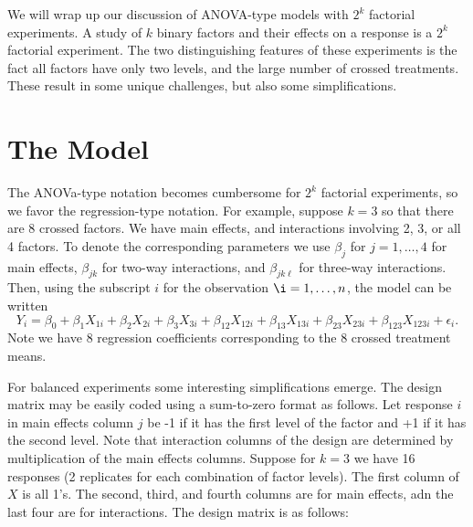 \documentclass[
]{book}
\begin{document}
We will wrap up our discussion of ANOVA-type models with \(2^k\) factorial experiments. A study of \(k\) binary factors and their effects on a response is a \(2^k\) factorial experiment. The two distinguishing features of these experiments is the fact all factors have only two levels, and the large number of crossed treatments. These result in some unique challenges, but also some simplifications.

\hypertarget{the-model-1}{%
\section{The Model}\label{the-model-1}}

The ANOVa-type notation becomes cumbersome for \(2^k\) factorial experiments, so we favor the regression-type notation. For example, suppose \(k=3\) so that there are 8 crossed factors. We have main effects, and interactions involving 2, 3, or all 4 factors. To denote the corresponding parameters we use \(\beta_j\) for \(j=1, \ldots, 4\) for main effects, \(\beta_{jk}\) for two-way interactions, and \(\beta_{jk\ell}\) for three-way interactions. Then, using the subscript \(i\) for the observation \(\i = 1, \ldots, n\), the model can be written
\[Y_i = \beta_0 + \beta_1X_{1i}+\beta_2X_{2i}+\beta_3 X_{3i} + \beta_{12}X_{12i} + \beta_{13}X_{13i}+\beta_{23}X_{23i} + \beta_{123}X_{123i}+\epsilon_i.  \]
Note we have 8 regression coefficients corresponding to the 8 crossed treatment means.

For balanced experiments some interesting simplifications emerge. The design matrix may be easily coded using a sum-to-zero format as follows. Let response \(i\) in main effects column \(j\) be -1 if it has the first level of the factor and +1 if it has the second level. Note that interaction columns of the design are determined by multiplication of the main effects columns. Suppose for \(k=3\) we have 16 responses (2 replicates for each combination of factor levels). The first column of \(X\) is all 1's. The second, third, and fourth columns are for main effects, adn the last four are for interactions. The design matrix is as follows:
\end{document}

